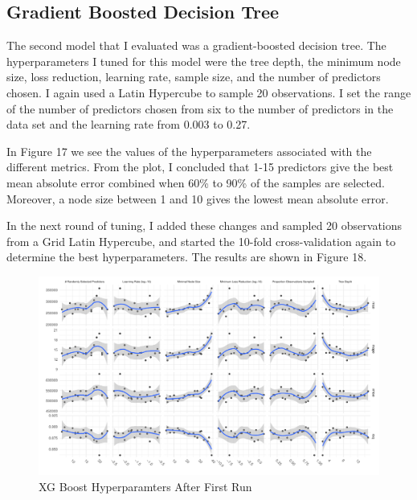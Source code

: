 \documentclass[
]{article}
\begin{document}
\hypertarget{gradient-boosted-decision-tree}{%
\subsection{Gradient Boosted Decision
Tree}\label{gradient-boosted-decision-tree}}

The second model that I evaluated was a gradient-boosted decision tree.
The hyperparameters I tuned for this model were the tree depth, the
minimum node size, loss reduction, learning rate, sample size, and the
number of predictors chosen. I again used a Latin Hypercube to sample 20
observations. I set the range of the number of predictors chosen from
six to the number of predictors in the data set and the learning rate
from 0.003 to 0.27.

In Figure 17 we see the values of the hyperparameters associated with
the different metrics. From the plot, I concluded that 1-15 predictors
give the best mean absolute error combined when 60\% to 90\% of the
samples are selected. Moreover, a node size between 1 and 10 gives the
lowest mean absolute error.

In the next round of tuning, I added these changes and sampled 20
observations from a Grid Latin Hypercube, and started the 10-fold
cross-validation again to determine the best hyperparameters. The
results are shown in Figure 18.

\begin{figure}
\centering
\includegraphics{final_report_files/figure-latex/unnamed-chunk-32-1.pdf}
\caption{XG Boost Hyperparamters After First Run}
\end{figure}
\end{document}
